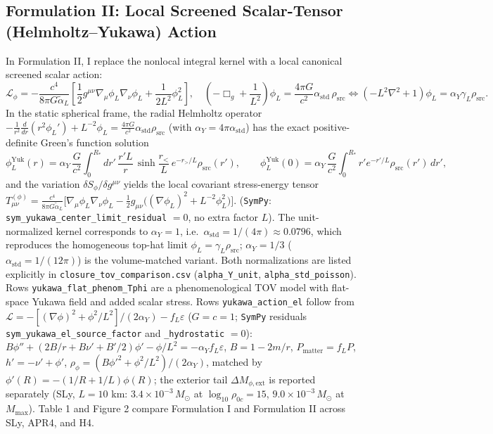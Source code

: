 \documentclass[10pt,a4paper]{article}
\begin{document}
\subsection{Formulation II: Local Screened Scalar-Tensor (Helmholtz--Yukawa) Action}
In Formulation II, I replace the nonlocal integral kernel with a local canonical screened scalar action:
\begin{equation}
  \mathcal{L}_\phi = -\frac{c^4}{8\pi G \tilde{\alpha}_L}\!\left[\frac{1}{2}g^{\mu\nu}\nabla_\mu\phi_L\nabla_\nu\phi_L + \frac{1}{2L^2}\phi_L^2\right], \quad \left(-\Box_g + \frac{1}{L^2}\right)\phi_L = \frac{4\pi G}{c^2}\alpha_{\text{std}}\,\rho_{\text{src}} \iff (-L^2\nabla^2+1)\phi_L = \alpha_Y\gamma_L\rho_{\text{src}}.
\end{equation}
In the static spherical frame, the radial Helmholtz operator $-\frac{1}{r^2}\frac{d}{dr}(r^2\phi_L') + L^{-2}\phi_L = \frac{4\pi G}{c^2}\alpha_{\text{std}}\rho_{\text{src}}$ (with $\alpha_Y = 4\pi\alpha_{\text{std}}$) has the exact positive-definite Green's function solution
\begin{equation}
  \phi_L^{\text{Yuk}}(r) = \alpha_Y\,\frac{G}{c^2}\int_0^{R_*} dr'\,\frac{r' L}{r}\,\sinh\!\frac{r_<}{L}\,e^{-r_>/L}\rho_{\text{src}}(r'), \qquad \phi_L^{\text{Yuk}}(0) = \alpha_Y\,\frac{G}{c^2}\int_0^{R_*} r' e^{-r'/L}\rho_{\text{src}}(r')\,dr',
\end{equation}
and the variation $\delta S_\phi/\delta g^{\mu\nu}$ yields the local covariant stress-energy tensor $T_{\mu\nu}^{(\phi)} = \frac{c^4}{8\pi G\tilde{\alpha}_L}\bigl[\nabla_\mu\phi_L\nabla_\nu\phi_L - \frac{1}{2}g_{\mu\nu}\bigl((\nabla\phi_L)^2 + L^{-2}\phi_L^2\bigr)\bigr]$. (\texttt{SymPy}: \texttt{sym\_yukawa\_center\_limit\_residual} $=0$, no extra factor $L$). The unit-normalized kernel corresponds to $\alpha_Y = 1$, i.e.\ $\alpha_{\text{std}} = 1/(4\pi)\approx 0.0796$, which reproduces the homogeneous top-hat limit $\phi_L = \gamma_L\rho_{\text{src}}$; $\alpha_Y = 1/3$ ($\alpha_{\text{std}} = 1/(12\pi)$) is the volume-matched variant. Both normalizations are listed explicitly in \texttt{closure\_tov\_comparison.csv} (\texttt{alpha\_Y\_unit}, \texttt{alpha\_std\_poisson}). Rows \texttt{yukawa\_flat\_phenom\_Tphi} are a phenomenological TOV model with flat-space Yukawa field and added scalar stress. Rows \texttt{yukawa\_action\_el} follow from $\mathcal{L}=-[(\nabla\phi)^2+\phi^2/L^2]/(2\alpha_Y)-f_L\varepsilon$ ($G=c=1$; \texttt{SymPy} residuals \texttt{sym\_yukawa\_el\_source\_factor} and \texttt{\_hydrostatic} $=0$): $B\phi''+(2B/r+B\nu'+B'/2)\phi'-\phi/L^2=-\alpha_Y f_L\varepsilon$, $B=1-2m/r$, $P_{\text{matter}}=f_LP$, $h'=-\nu'+\phi'$, $\rho_\phi=(B\phi'^2+\phi^2/L^2)/(2\alpha_Y)$, matched by $\phi'(R)=-(1/R+1/L)\phi(R)$; the exterior tail $\Delta M_{\phi,\text{ext}}$ is reported separately (SLy, $L=10$ km: $3.4\times 10^{-3}\,M_\odot$ at $\log_{10}\rho_{0c}=15$, $9.0\times 10^{-3}\,M_\odot$ at $M_{\max}$). Table 1 and Figure 2 compare Formulation I and Formulation II across SLy, APR4, and H4.
\end{document}
